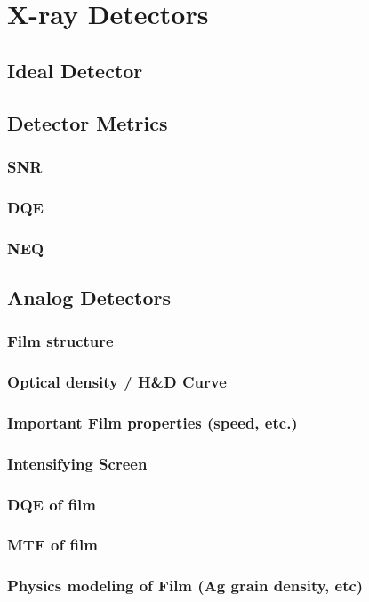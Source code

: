 \documentclass[mphy386-notes.tex]{subfiles}
\begin{document}
\section{X-ray Detectors}
\subsection{Ideal Detector}
\subsection{Detector Metrics}
\subsubsection{SNR}
\subsubsection{DQE}
\subsubsection{NEQ}
\subsection{Analog Detectors}
\subsubsection{Film structure}
\subsubsection{Optical density / H\&D Curve}
\subsubsection{Important Film properties (speed, etc.)}
\subsubsection{Intensifying Screen}
\subsubsection{DQE of film}
\subsubsection{MTF of film}
\subsubsection{Physics modeling of Film (Ag grain density, etc)}
\end{document}
